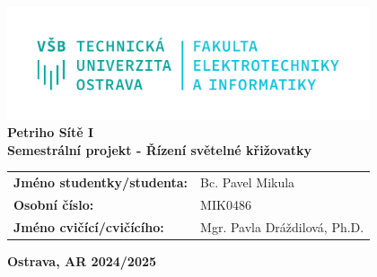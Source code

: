 \documentclass[a4paper,12pt]{report}
\newcommand{\studentName}{Bc. Pavel Mikula}
\newcommand{\studentID}  {MIK0486}
\newcommand{\teacherName}{Mgr. Pavla Dráždilová, Ph.D.}
\begin{document}
\thispagestyle{empty}
\setcounter{page}{0}

\begin{center}
    \includegraphics[width=0.8\textwidth]{assets/logo.png} \\[4em]
    \vspace{4em}
    \textbf{\huge{Petriho Sítě I}} \\
    \vspace{4em}
    \textbf{\large{Semestrální projekt - Řízení světelné křižovatky}} \\
\end{center}

\vspace{3em}
\hspace{2em}
\begin{tabular}{ll}
    \textbf{Jméno studentky/studenta:}  & \hspace{6em} \studentName \\[0.5em]
    \textbf{Osobní číslo:}              & \hspace{6em} \studentID   \\[0.5em]
    \textbf{Jméno cvičící/cvičícího:}   & \hspace{6em} \teacherName \\
\end{tabular}

\vspace{25em}
\begin{center}
    \textbf{Ostrava, AR 2024/2025}
\end{center}

\newpage



\newpage


\newpage


\newpage



\end{document}
